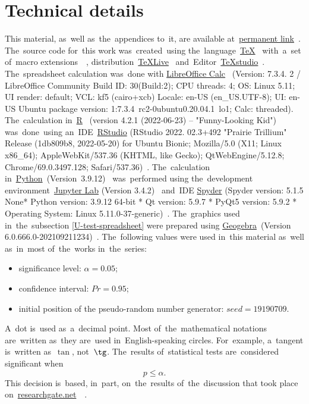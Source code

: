 \documentclass[russian,english]{scrreprt}
\begin{document}
%
\tableofcontents
\listoftables
\listoffigures
\lstlistoflistings
%	
\chapter{Technical details}
This material, as~well as~the~appendices to~it, are available at~\href{https://github.com/Kirill-Murashev/AI_for_valuers_book/tree/main/Parts-Chapters/Mann-Whitney-Wilcoxon}{permanent link}~\cite{Murashev:u-test}. The~source code for~this work was~created~using the~language~\href{https://www.ctan.org/}{\TeX}~\cite{TeX:site} with~a~set of~macro extensions~\href{https://www latex-project.org/}{\LaTeXe}~\cite{LaTeX:site}, distribution~\href{https://www.tug.org/texlive/}{TeXLive}~\cite{TeXLive:site} and~Editor~\href{https://www.texstudio.org/}{TeXstudio}~\cite{TeXstudio:site}. The~spreadsheet calculation was~done with \href{https://www.libreoffice.org/discover/calc/}{LibreOffice Calc}~\cite{LO:Calc} (Version: 7.3.4. 2 / LibreOffice Community Build ID: 30(Build:2); CPU threads: 4; OS: Linux 5.11; UI render: default; VCL: kf5 (cairo+xcb) Locale: en-US (en\_US.UTF-8); UI: en-US Ubuntu package version: 1:7.3.4~rc2-0ubuntu0.20.04.1~lo1; Calc: threaded). The~calculation in~\href{https://www.r-project.org/}{R}~\cite{R_language} (version 4.2.1 (2022-06-23) -- "Funny-Looking Kid") was~done~using an~IDE~\href{https://www.rstudio.com/}{RStudio} (RStudio 2022. 02.3+492 "Prairie Trillium" Release (1db809b8, 2022-05-20) for Ubuntu Bionic; Mozilla/5.0 (X11; Linux x86\_64); AppleWebKit/537.36 (KHTML, like Gecko); QtWebEngine/5.12.8; Chrome/69.0.3497.128; Safari/537.36)~\cite{RStudio:official_site}. The~calculation in~\href{https://www.python.org/}{Python}~(Version~3.9.12)~\cite{Python:site} was~performed using the~development environment~\href{https://jupyter.org}{Jupyter Lab} (Version 3.4.2)~\cite{Jupyter:site} and~IDE \href{https://www.spyder-ide.org/}{Spyder} (Spyder version: 5.1.5 None* Python version: 3.9.12 64-bit * Qt version: 5.9.7 * PyQt5 version: 5.9.2
* Operating System: Linux 5.11.0-37-generic)~\cite{Spyder:site}. The~graphics used in~the~subsection \ref{U-test-spreadsheet} were prepared using \href{Geogebra:official-site}{Geogebra}~(Version 6.0.666.0-202109211234)~\cite{Geogebra:official-site}. The~following values were used in~this material as~well as~in~most of~the~works in~the~series:
\begin{itemize}
	\item significance level: $\alpha = 0.05$;
	\item confidence interval: $Pr = 0.95$;
	\item initial position of the pseudo-random number generator: $seed=19190709$.
\end{itemize}
A~dot is~used as~a~decimal point. Most of~the~mathematical notations are~written as~they are~used in~English-speaking circles. For~example, a~tangent is~written as~$\tan$, not~$\tg$. The~results of~statistical tests are~considered significant when
\begin{equation}\label{eq:significance}
p \leq \alpha.
\end{equation}
This decision is~based, in~part, on~the~results of~the~discussion that took place on~\href{researchgate.net}{researchgate.net}~~\cite{RG:p-equals-alpha}.
%
\end{document}
